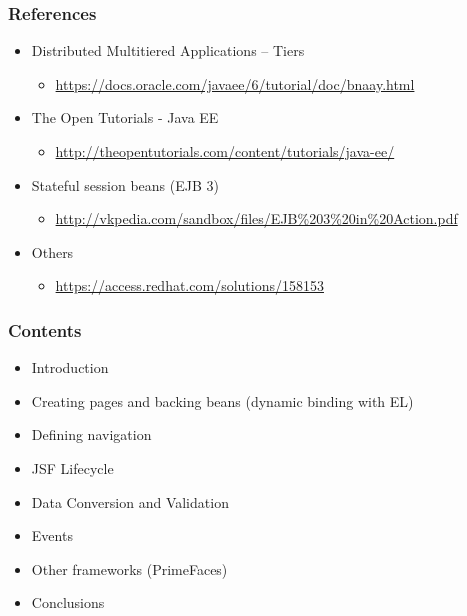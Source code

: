 \documentclass[10pt,xcolor=pdflatex]{beamer}
\begin{document}
\begin{frame}\frametitle{References}
	\begin{itemize}
            \item Distributed Multitiered Applications -- Tiers
          \begin{itemize}
            \item \url{https://docs.oracle.com/javaee/6/tutorial/doc/bnaay.html}
          \end{itemize}
		\item The Open Tutorials - Java EE
          \begin{itemize}
        	\item[] {\footnotesize\url{http://theopentutorials.com/content/tutorials/java-ee/}}
          \end{itemize}
        \item Stateful session beans (EJB 3)
         \begin{itemize}
        	\item[] {\footnotesize\url{http://vkpedia.com/sandbox/files/EJB\%203\%20in\%20Action.pdf}}
          \end{itemize}
        \item Others
          \begin{itemize}
            \item \url{https://access.redhat.com/solutions/158153}
          \end{itemize}
	\end{itemize}
\end{frame}


\begin{frame}\frametitle{Contents}
  \begin{itemize}
    \item Introduction
    \item Creating pages and backing beans (dynamic binding with EL)
    \item Defining navigation
    \item JSF Lifecycle
    \item Data Conversion and Validation
    \item Events
    \item Other frameworks (PrimeFaces)
    \item Conclusions
  \end{itemize}
\end{frame}
\end{document}
